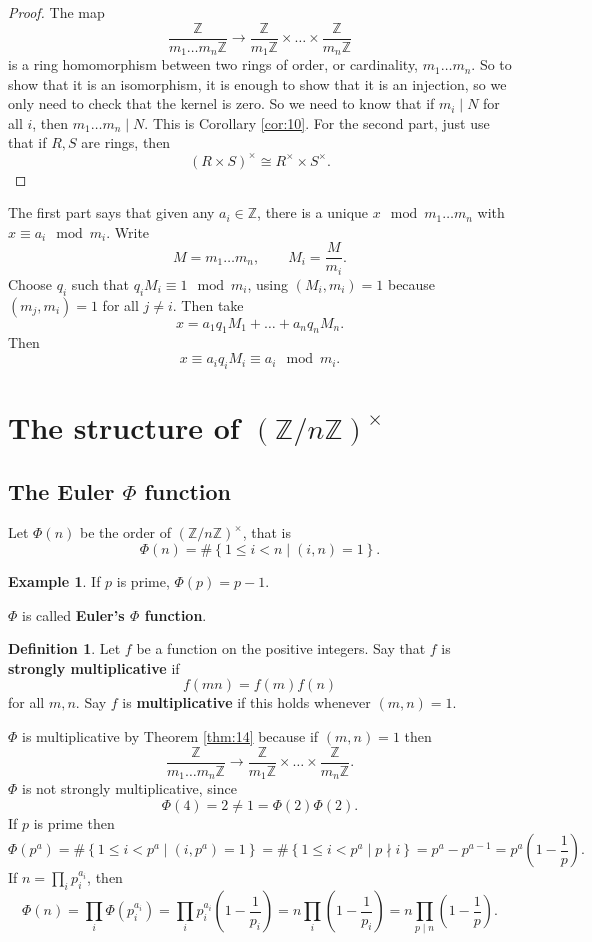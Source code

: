\documentclass{article}
\newcommand{\Z}{\mathbb{Z}}
\newcommand{\rb}[1]{\left( #1 \right)}
\newcommand{\cb}[1]{\left\{ #1 \right\}}
\newcommand{\unit}[1]{\rb{\Z / #1\Z}^\times}
\theoremstyle{definition}\newtheorem{definition}{Definition}
\theoremstyle{definition}\newtheorem{remark}[definition]{Remark}
\theoremstyle{definition}\newtheorem*{example}{Example}
\theoremstyle{definition}\newtheorem*{note}{Note}
\begin{document}
\begin{proof}
The map
$$ \dfrac{\Z}{m_1 \dots m_n\Z} \to \dfrac{\Z}{m_1\Z} \times \dots \times \dfrac{\Z}{m_n\Z} $$
is a ring homomorphism between two rings of order, or cardinality, $ m_1 \dots m_n $. So to show that it is an isomorphism, it is enough to show that it is an injection, so we only need to check that the kernel is zero. So we need to know that if $ m_i \mid N $ for all $ i $, then $ m_1 \dots m_n \mid N $. This is Corollary \ref{cor:10}. For the second part, just use that if $ R, S $ are rings, then
$$ \rb{R \times S}^\times \cong R^\times \times S^\times. $$
\end{proof}

The first part says that given any $ a_i \in \Z $, there is a unique $ x \mod m_1 \dots m_n $ with $ x \equiv a_i \mod m_i $. Write
$$ M = m_1 \dots m_n, \qquad M_i = \dfrac{M}{m_i}. $$
Choose $ q_i $ such that $ q_iM_i \equiv 1 \mod m_i $, using $ \rb{M_i, m_i} = 1 $ because $ \rb{m_j, m_i} = 1 $ for all $ j \ne i $. Then take
$$ x = a_1q_1M_1 + \dots + a_nq_nM_n. $$
Then
$$ x \equiv a_iq_iM_i \equiv a_i \mod m_i. $$

\pagebreak

\section{The structure of $ \unit{n} $}

\subsection{The Euler $ \Phi $ function}

Let $ \Phi\rb{n} $ be the order of $ \unit{n} $, that is
$$ \Phi\rb{n} = \#\cb{1 \le i < n \mid \rb{i, n} = 1}. $$

\begin{example}
If $ p $ is prime, $ \Phi\rb{p} = p - 1 $.
\end{example}

$ \Phi $ is called \textbf{Euler's $ \Phi $ function}.

\begin{definition}
Let $ f $ be a function on the positive integers. Say that $ f $ is \textbf{strongly multiplicative} if
$$ f\rb{mn} = f\rb{m}f\rb{n} $$
for all $ m, n $. Say $ f $ is \textbf{multiplicative} if this holds whenever $ \rb{m, n} = 1 $.
\end{definition}
  
$ \Phi $ is multiplicative by Theorem \ref{thm:14} because if $ \rb{m, n} = 1 $ then
$$ \dfrac{\Z}{m_1 \dots m_n\Z} \to \dfrac{\Z}{m_1\Z} \times \dots \times \dfrac{\Z}{m_n\Z}. $$
$ \Phi $ is not strongly multiplicative, since
$$ \Phi\rb{4} = 2 \ne 1 = \Phi\rb{2}\Phi\rb{2}. $$
If $ p $ is prime then
$$ \Phi\rb{p^a} = \#\cb{1 \le i < p^a \mid \rb{i, p^a} = 1} = \#\cb{1 \le i < p^a \mid p \nmid i} = p^a - p^{a - 1} = p^a\rb{1 - \dfrac{1}{p}}. $$
If $ n = \prod_i p_i^{a_i} $, then
$$ \Phi\rb{n} = \prod_i \Phi\rb{p_i^{a_i}} = \prod_i p_i^{a_i}\rb{1 - \dfrac{1}{p_i}} = n\prod_i \rb{1 - \dfrac{1}{p_i}} = n\prod_{p \mid n} \rb{1 - \dfrac{1}{p}}. $$
\end{document}
